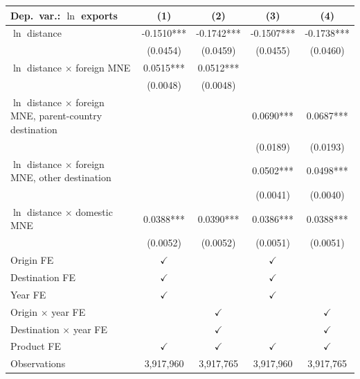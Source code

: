 \begin{tabular}{lcccc} \hline
Dep.\ var.: $\ln$ exports & (1) & (2) & (3) & (4) \\ \hline
$\ln$ distance & -0.1510*** & -0.1742*** & -0.1507*** & -0.1738*** \\
 & (0.0454) & (0.0459) & (0.0455) & (0.0460) \\
$\ln$ distance $\times$ foreign MNE & 0.0515*** & 0.0512*** &  &  \\
 & (0.0048) & (0.0048) &  &  \\
$\ln$ distance $\times$ foreign MNE, parent-country destination &  &  & 0.0690*** & 0.0687*** \\
 &  &  & (0.0189) & (0.0193) \\
$\ln$ distance $\times$ foreign MNE, other destination &  &  & 0.0502*** & 0.0498*** \\
 &  &  & (0.0041) & (0.0040) \\
$\ln$ distance $\times$ domestic MNE & 0.0388*** & 0.0390*** & 0.0386*** & 0.0388*** \\
 & (0.0052) & (0.0052) & (0.0051) & (0.0051) \\
\hline
Origin FE & $\checkmark$ &  & $\checkmark$ &  \\
Destination FE & $\checkmark$ &  & $\checkmark$ &  \\
Year FE & $\checkmark$ &  & $\checkmark$ &  \\
Origin $\times$ year FE &  & $\checkmark$ &  & $\checkmark$ \\
Destination $\times$ year FE &  & $\checkmark$ &  & $\checkmark$ \\
Product FE & $\checkmark$ & $\checkmark$ & $\checkmark$ & $\checkmark$ \\
\hline
Observations & 3,917,960 & 3,917,765 & 3,917,960 & 3,917,765 \\
\hline
\end{tabular}

